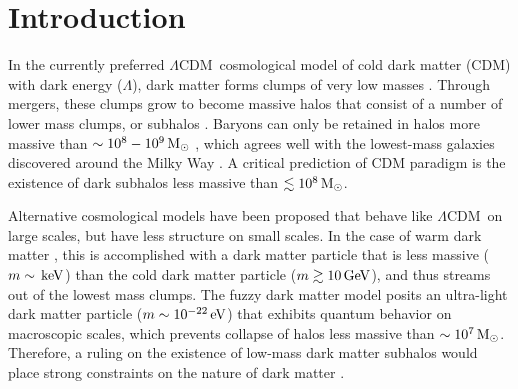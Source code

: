 \documentclass[twocolumn]{aastex62}
\newcommand{\acronym}[1]{{\small{#1}}}
\newcommand{\lcdm}{\acronym{$\Lambda$CDM}}
\begin{document}
\begin{abstract}

\end{abstract}


\section{Introduction}
\label{sec:intro}
In the currently preferred \lcdm\ cosmological model of cold dark matter (CDM) with dark energy ($\Lambda$), dark matter forms clumps of very low masses \citep[e.g.,][]{springel2008}.
Through mergers, these clumps grow to become massive halos that consist of a number of lower mass clumps, or subhalos \citep[e.g.,][]{whiterees1978}. 
Baryons can only be retained in halos more massive than $\sim10^8-10^9\,\rm M_\odot$ \citep[e.g.,][]{efstathiou1992, bullock2000}, which agrees well with the lowest-mass galaxies discovered around the Milky Way \citep[e.g.,][]{sg2007, martin2008}.
A critical prediction of CDM paradigm is the existence of dark subhalos less massive than $\lesssim10^8\,\rm M_\odot$.

Alternative cosmological models have been proposed that behave like \lcdm\ on large scales, but have less structure on small scales.
In the case of warm dark matter \citep[e.g.,][]{bode2001}, this is accomplished with a dark matter particle that is less massive ($m\sim\rm\, keV$) than the cold dark matter particle ($m\gtrsim10\rm\, GeV$), and thus streams out of the lowest mass clumps.
The fuzzy dark matter model \citep[e.g.,][]{hu2000} posits an ultra-light dark matter particle ($m\sim10^{-22}\rm\, eV$) that exhibits quantum behavior on macroscopic scales, which prevents collapse of halos less massive than $\sim10^7\,\rm M_\odot$.
Therefore, a ruling on the existence of low-mass dark matter subhalos would place strong constraints on the nature of dark matter \citep[e.g.,][]{bullockmbk2017, buckleypeter2017}.
\end{document}

